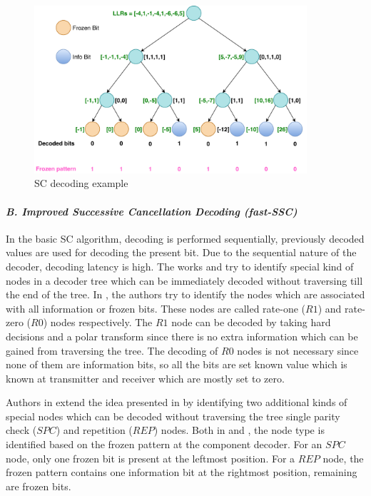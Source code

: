 \begin{figure}[h]
	\centering
	\includegraphics[width=0.9\textwidth]{./figures/SCDecodingExample1.pdf}
	\caption{SC decoding example}
	\label{fig:scDecodingEg}
\end{figure}


\paragraph{\emph{B. Improved Successive Cancellation Decoding (fast-SSC)}\newline}  \label{fastSSC} 
In the basic SC algorithm, decoding is performed sequentially, previously decoded values are used for decoding the present bit. Due to the sequential nature of the decoder, decoding latency is high. The works \cite{SSC} and \cite{fastSSC} try to identify special kind of nodes in a decoder tree which can be immediately decoded without traversing till the end of the tree. In \cite{SSC}, the authors try to identify the nodes which are associated with all information or frozen bits. These nodes are called rate-one ($R1$) and rate-zero ($R0$) nodes respectively. The $R1$ node can be decoded by taking hard decisions and a polar transform since there is no extra information which can be gained from traversing the tree. The decoding of $R0$ nodes is not necessary since none of them are information bits, so all the bits are set known value which is known at transmitter and receiver which are mostly set to zero. \par Authors in \cite{fastSSC} extend the idea presented in \cite{SSC} by identifying two additional kinds of special nodes which can be decoded without traversing the tree single parity check ($SPC$) and repetition ($REP$) nodes. Both in \cite{SSC} and \cite{fastSSC}, the node type is identified based on the frozen pattern at the component decoder. For an $SPC$ node, only one frozen bit is present at the leftmost position. For a $REP$ node, the frozen pattern contains one information bit at the rightmost position, remaining are frozen bits.

